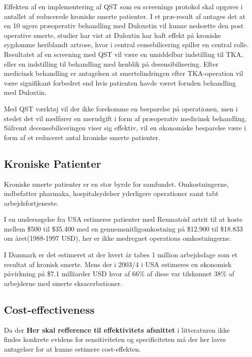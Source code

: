 Effekten af en implementering af QST som en screenings protokol skal opgøres i antallet af reducerede kroniske smerte patienter. I et præ-result af  antages det at en 10 ugers præoperativ behandling med Duloxetin vil kunne nedsætte den post operative smerte, studier har vist at Duloxtin har haft effekt på kroniske sygdomme heriblandt artrose, hvor i central censebilicering spiller en central rolle. \citep{Blikman2016} Resultatet af en screening med QST vil være en umiddelbar indstilling til TKA, eller en indstilling til behandling med henblik på desensibilisering. Efter medicinsk behandling er antagelsen at smertelindringen efter TKA-operation vil være signifikant forbedret end hvis patienten havde været foruden behandling med Duloxtin.

Med QST værktøj vil der ikke forekomme en besparelse på operationen, men i stedet det vil medfører en merudgift i form af præoperativ medicinsk behandling. Såfremt decensebiliceringen viser sig effektiv, vil en økonomiske besparelse være i form af et reduceret antal kroniske smerte patienter.

\subsection{Kroniske Patienter}

Kroniske smerte patienter er en stor byrde for samfundet. Omkostningerne, indbefatter pharmaka, hospitalsydelser yderligere operationer samt tabt arbejdsfortjeneste. 

I en undersøgelse fra USA estimeres patienter med Reumatoid artrit til at koste mellem \$500 til \$35.400 med en gennemsnitligomkostning på \$12.900 til \$18.833  om året(1988-1997 USD), her er ikke medregnet operations omkostningerne.\citep{Turk2002}

I Danmark er det estimeret at der hvert år tabes 1 million arbejdsdage som et resultat af kronisk smerte.\citep{Eriksen2006} Mens der i 2003/4 i USA estimeres en økonomisk påvirkning på \$7.1 milliarder USD hvor af 66\% af disse var tilskønnet 38\% af arbejderne med smerte eksacerbationer. \citep{Phillips2009}

\subsection{Cost-effectiveness}

Da der \textbf{Her skal refference til effektivitets afsnittet} i litteraturen ikke findes konkrete evidens for sensitiviteten og specificiteten må der her laves antagelser for at kunne estimere cost-effekten. 

